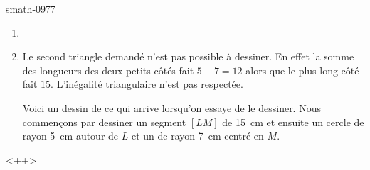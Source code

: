 
\begin{corrige}{smath-0977}

    \begin{enumerate}
        \item
        \item
            Le second triangle demandé n'est pas possible à dessiner. En effet la somme des longueurs des deux petits côtés fait \( 5+7=12\) alors que le plus long côté fait \( 15\). L'inégalité triangulaire n'est pas respectée.

            Voici un dessin de ce qui arrive lorsqu'on essaye de le dessiner. Nous commençons par dessiner un segment \( [LM]\) de \SI{15}{\centi\meter} et ensuite un cercle de rayon \SI{5}{\centi\meter} autour de \( L\) et un de rayon \SI{7}{\centi\meter} centré en \( M\).


\begin{center}
   
\end{center}
    

    \end{enumerate}
    <++>

\end{corrige}
